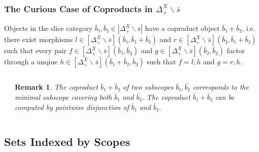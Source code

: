 \documentclass[aspectratio=169]{beamer}
\theoremstyle{remarkstyle}
\newtheorem*{remark}{Remark}
\begin{document}
\begin{frame}[fragile]
  \frametitle{The Curious Case of Coproducts in $Δ_+^X∖\bar{s}$}
  \begin{theorem}
    Objects in the slice category $\bar{b}₁, \bar{b}₂ ∈ |Δ_+^X∖\bar{s}|$ have a coproduct object $\bar{b}₁ + \bar{b}₂$, i.e. there exist morphisms $l ∈ [Δ_+^X∖\bar{s}](\bar{b}₁, \bar{b}₁ + \bar{b}₂)$ and $r ∈ [Δ_+^X∖\bar{s}](\bar{b}₂, \bar{b}₁ + \bar{b}₂)$ such that every pair $f ∈ [Δ_+^X∖\bar{s}](\bar{b}₁, \bar{b}_3)$ and $g ∈ [Δ_+^X∖\bar{s}](\bar{b}₂, \bar{b}_3)$ factor through a unqiue $h ∈ [Δ_+^X∖\bar{s}](\bar{b}₁ + \bar{b}₂, \bar{b}_3)$ such that $f = l;h$ and $g = r;h$.
  \end{theorem}
  \begin{columns}
    \begin{column}{0.5\textwidth}
      \begin{example}
      \end{example}
    \end{column}
    \begin{column}{0.46\textwidth}
      \begin{remark}
        The coproduct $\bar{b}₁ + \bar{b}₂$ of two subscopes $\bar{b}₁, \bar{b₂}$ 
        corresponds to the minimal subscope covering both $\bar{b}₁$ and $\bar{b₂}$. 
        The coproduct $\bar{b}₁ + \bar{b}₂$ can be computed by pointwise disjunction of $\bar{b}₁$ and $\bar{b}₂$. 
      \end{remark}
    \end{column}
  \end{columns}
\end{frame}

\subsection{Sets Indexed by Scopes}
\end{document}
